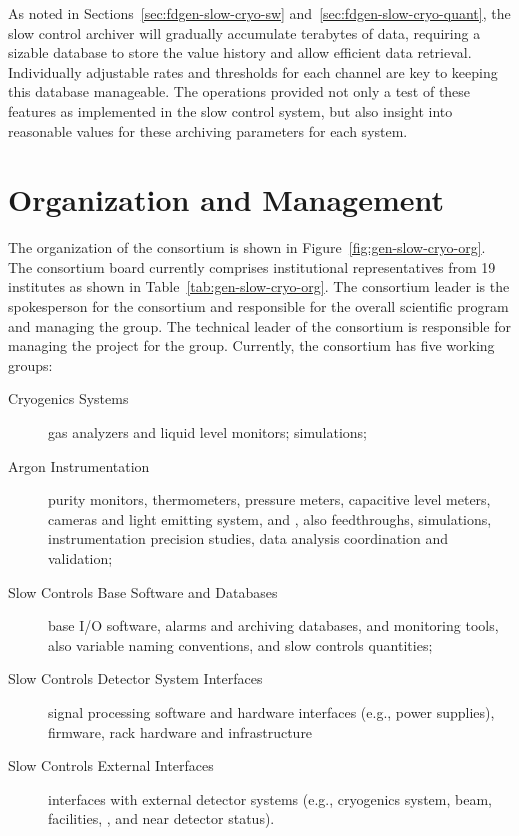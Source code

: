 As noted in Sections~\ref{sec:fdgen-slow-cryo-sw} and~\ref{sec:fdgen-slow-cryo-quant},
the slow control archiver will gradually accumulate terabytes of
data, requiring a sizable database to store the value history and
allow efficient data retrieval. Individually adjustable rates and
thresholds for each channel are key to keeping this database
manageable. The  operations provided not only a test of
these features as implemented in the  slow control system, but also insight into
reasonable values for these archiving parameters for each system.


\section{Organization and Management}
\label{sec:cisc-slow-controls-org}

The organization of the  consortium is shown in
 Figure~\ref{fig:gen-slow-cryo-org}. The  consortium board currently comprises institutional representatives from 19 institutes as shown in Table~\ref{tab:gen-slow-cryo-org}. The consortium leader is the spokesperson for the consortium and responsible for the overall scientific program and managing the group. The technical leader of the consortium is responsible for managing the project for the group. Currently, the
consortium has five working groups:
\begin{description}
 \item[Cryogenics Systems] gas analyzers and liquid level
  monitors;  simulations;
  
 \item[Argon Instrumentation] purity monitors, thermometers, pressure meters, capacitive level meters, cameras and light emitting system, and , also feedthroughs, \efield simulations, instrumentation precision studies,  data analysis coordination and validation; 
 
 \item [Slow Controls Base Software and Databases]  base I/O software, alarms and archiving databases, and monitoring tools, also 
   variable naming conventions, and slow controls quantities;
 \item [Slow Controls Detector System Interfaces] signal processing software and hardware interfaces (e.g., power supplies), firmware, rack hardware and infrastructure   
 \item [Slow Controls External Interfaces] interfaces with external detector systems (e.g., cryogenics system, beam, facilities, , and near detector status).
\end{description}

